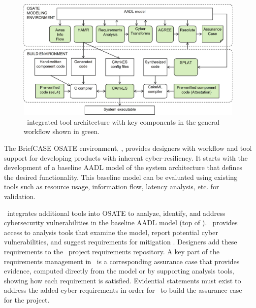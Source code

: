 \begin{figure}
	\begin{center}
	  \includegraphics[width=\textwidth]{./figs/tool-arch.jpg}
  	\end{center}
	\caption{\brfcs\ integrated tool architecture with key components in the general workflow shown in green.} 
	\label{fig:tool-arch} 
\end{figure}

The BriefCASE OSATE environment, , provides designers with workflow and tool support for developing products with inherent cyber-resiliency.
It starts with the development of a baseline AADL model of the system architecture that defines the desired functionality.
This baseline model can be evaluated using existing tools such as resource usage, information flow, latency analysis, etc. for validation.

\brfcs\ integrates additional tools into OSATE to analyze, identify, and address cybersecurity vulnerabilities in the baseline AADL model (top of ).
\brfcs\ provides access to analysis tools that examine the model, report potential cyber vulnerabilities,
and suggest requirements for mitigation \cite{dcrypps2019,gearcase2020}.
Designers add these requirements to the \brfcs\ project requirements repository. 
A key part of the requirements management in \brfcs\ is a corresponding assurance case that provides evidence, computed directly from the model or by supporting analysis tools, showing how each requirement is satisfied.
Evidential statements must exist to address the added cyber requirements in order for \brfcs\ to build the assurance case for the project.

